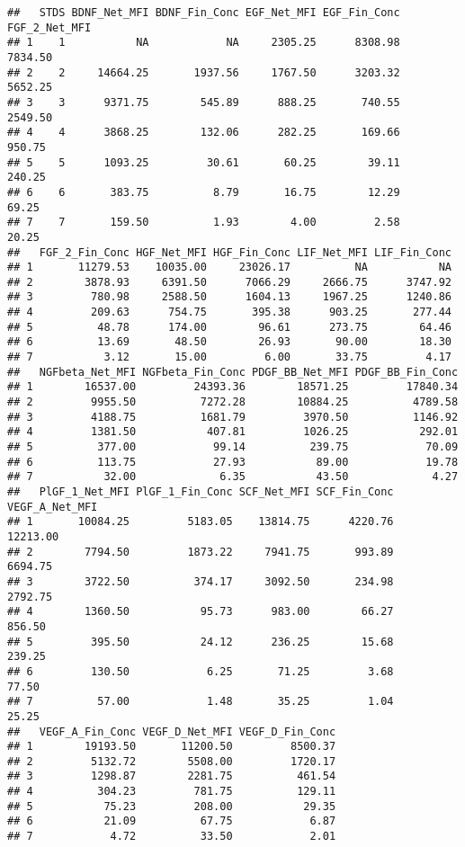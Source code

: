 \documentclass[]{article}
\begin{document}
\begin{verbatim}
##   STDS BDNF_Net_MFI BDNF_Fin_Conc EGF_Net_MFI EGF_Fin_Conc FGF_2_Net_MFI
## 1    1           NA            NA     2305.25      8308.98       7834.50
## 2    2     14664.25       1937.56     1767.50      3203.32       5652.25
## 3    3      9371.75        545.89      888.25       740.55       2549.50
## 4    4      3868.25        132.06      282.25       169.66        950.75
## 5    5      1093.25         30.61       60.25        39.11        240.25
## 6    6       383.75          8.79       16.75        12.29         69.25
## 7    7       159.50          1.93        4.00         2.58         20.25
##   FGF_2_Fin_Conc HGF_Net_MFI HGF_Fin_Conc LIF_Net_MFI LIF_Fin_Conc
## 1       11279.53    10035.00     23026.17          NA           NA
## 2        3878.93     6391.50      7066.29     2666.75      3747.92
## 3         780.98     2588.50      1604.13     1967.25      1240.86
## 4         209.63      754.75       395.38      903.25       277.44
## 5          48.78      174.00        96.61      273.75        64.46
## 6          13.69       48.50        26.93       90.00        18.30
## 7           3.12       15.00         6.00       33.75         4.17
##   NGFbeta_Net_MFI NGFbeta_Fin_Conc PDGF_BB_Net_MFI PDGF_BB_Fin_Conc
## 1        16537.00         24393.36        18571.25         17840.34
## 2         9955.50          7272.28        10884.25          4789.58
## 3         4188.75          1681.79         3970.50          1146.92
## 4         1381.50           407.81         1026.25           292.01
## 5          377.00            99.14          239.75            70.09
## 6          113.75            27.93           89.00            19.78
## 7           32.00             6.35           43.50             4.27
##   PlGF_1_Net_MFI PlGF_1_Fin_Conc SCF_Net_MFI SCF_Fin_Conc VEGF_A_Net_MFI
## 1       10084.25         5183.05    13814.75      4220.76       12213.00
## 2        7794.50         1873.22     7941.75       993.89        6694.75
## 3        3722.50          374.17     3092.50       234.98        2792.75
## 4        1360.50           95.73      983.00        66.27         856.50
## 5         395.50           24.12      236.25        15.68         239.25
## 6         130.50            6.25       71.25         3.68          77.50
## 7          57.00            1.48       35.25         1.04          25.25
##   VEGF_A_Fin_Conc VEGF_D_Net_MFI VEGF_D_Fin_Conc
## 1        19193.50       11200.50         8500.37
## 2         5132.72        5508.00         1720.17
## 3         1298.87        2281.75          461.54
## 4          304.23         781.75          129.11
## 5           75.23         208.00           29.35
## 6           21.09          67.75            6.87
## 7            4.72          33.50            2.01
\end{verbatim}
\end{document}
